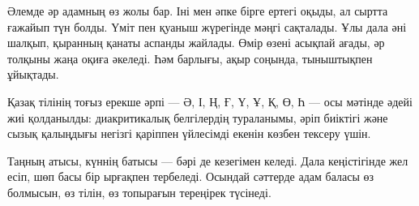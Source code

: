 Әлемде әр адамның өз жолы бар. Іні мен әпке бірге ертегі оқыды, ал сыртта ғажайып түн болды. Үміт пен қуаныш жүрегінде мәңгі сақталады. Ұлы дала әні шалқып, қыранның қанаты аспанды жайлады. Өмір өзені асықпай ағады, әр толқыны жаңа оқиға әкеледі. Һәм барлығы, ақыр соңында, тыныштықпен ұйықтады.

Қазақ тілінің тоғыз ерекше әрпі — Ә, І, Ң, Ғ, Ү, Ұ, Қ, Ө, Һ — осы мәтінде әдейі жиі қолданылды: диакритикалық белгілердің тураланымы, әріп биіктігі және сызық қалыңдығы негізгі қаріппен үйлесімді екенін көзбен тексеру үшін.

Таңның атысы, күннің батысы — бәрі де кезегімен келеді. Дала кеңістігінде жел есіп, шөп басы бір ырғақпен тербеледі. Осындай сәттерде адам баласы өз болмысын, өз тілін, өз топырағын тереңірек түсінеді.
